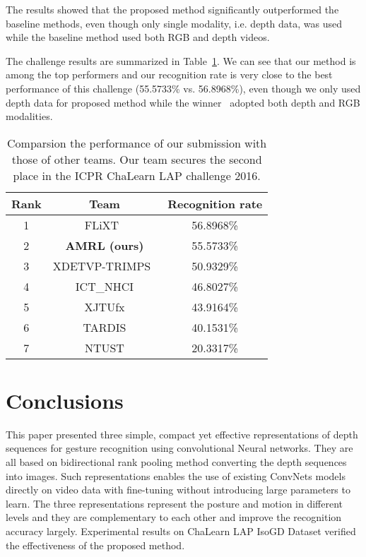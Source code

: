 \documentclass[10pt, a4paper, conference]{IEEEtran}
\begin{document}
The results showed that the proposed method 
significantly outperformed the baseline methods, even though only single 
modality, i.e. depth data, was used while the baseline method used both RGB and 
depth videos.

The challenge results are summarized in Table~\ref{table3}. We can see that our method is among the top performers and our recognition rate is very close to the best performance of this challenge (55.5733\% vs. 56.8968\%), even though we only used depth data for proposed method while the winner~\cite{yunanli} adopted both depth and RGB modalities.

\begin{table}[!ht]
\centering
\caption{Comparsion the performance of our submission with those of other teams. Our team secures the second place in the ICPR ChaLearn LAP challenge 2016. \label{table3}}
\begin{tabular}{|c|c|c|}
\hline
Rank & Team & Recognition rate \\
\hline
1 & FLiXT~\cite{yunanli} & 56.8968\%\\
\hline
2 & \textbf{AMRL (ours)} & 55.5733\%\\
\hline
3 & XDETVP-TRIMPS~\cite{guangming} & 50.9329\%\\
\hline
4 & ICT\_NHCI & 46.8027\%\\
\hline
5 & XJTUfx & 43.9164\%\\
\hline
6 & TARDIS & 40.1531\%\\
\hline
7 & NTUST & 20.3317\%\\
\hline
\end{tabular}
\end{table}

\section{Conclusions}

This paper presented three simple, compact yet effective representations of depth sequences for gesture recognition using convolutional Neural networks. They are all based on bidirectional rank pooling method converting the depth sequences into images. Such representations enables the use of existing ConvNets models directly on video data with fine-tuning without introducing large parameters to learn. The three representations represent the posture and motion in different levels and they are complementary to each other and improve the recognition accuracy largely. Experimental results on ChaLearn LAP IsoGD Dataset verified the effectiveness of the proposed method.
\end{document}
